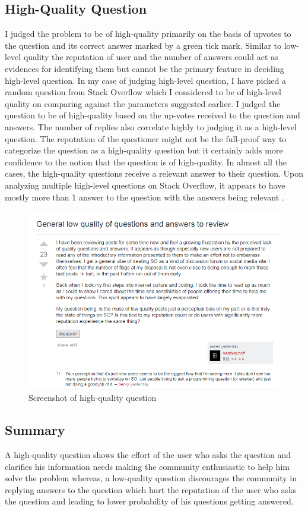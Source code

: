 \documentclass[12pt]{report}
\begin{document}
\subsection{High-Quality Question}
I judged the problem to be of high-quality primarily on the basis of upvotes to the question and its correct answer marked by a green tick mark. Similar to low-level quality the reputation of user and the number of answers  could act as evidences for identifying them but cannot be the primary feature in deciding high-level question.
In my case of judging high-level question, I have picked a random question from Stack Overflow which I considered to be of high-level quality on comparing against the parameters suggested earlier. I judged the question to be of high-quality based on the up-votes received to the question and answers. The number of replies also correlate highly to judging it as a high-level question. The reputation of the questioner might not be the full-proof way to categorize the question as a high-quality question but it certainly adds more confidence to the notion that the question is of high-quality.
In almost all the cases, the high-quality questions receive a relevant answer to their question. Upon analyzing multiple high-level questions on Stack Overflow, it appears to have mostly more than 1 answer to the question with the answers being relevant . 
\begin{figure}[ht]
  \centering
  \includegraphics[width=1\textwidth]{Problem10_5/HighQuality.png}
  \caption{Screenshot of high-quality question}
  \label{fig:1}
\end{figure} 

\subsection{Summary}
A high-quality question shows the effort of the user who asks the question and clarifies his information needs making the community enthusiastic to help him solve the problem whereas, a low-quality question discourages the community in replying answers to the question which hurt the reputation of the user who asks the question and leading to lower probability of his questions getting answered. 
\end{document}
